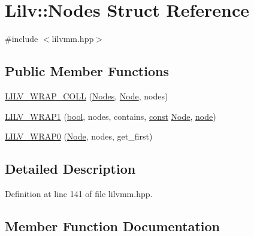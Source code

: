 \hypertarget{struct_lilv_1_1_nodes}{}\section{Lilv\+:\+:Nodes Struct Reference}
\label{struct_lilv_1_1_nodes}


{\ttfamily \#include $<$lilvmm.\+hpp$>$}

\subsection*{Public Member Functions}
\begin{DoxyCompactItemize}
\item 
\hyperlink{struct_lilv_1_1_nodes_ae3a152f247d1200901b7e9b3cc967046}{L\+I\+L\+V\+\_\+\+W\+R\+A\+P\+\_\+\+C\+O\+LL} (\hyperlink{struct_lilv_1_1_nodes}{Nodes}, \hyperlink{struct_lilv_1_1_node}{Node}, nodes)
\item 
\hyperlink{struct_lilv_1_1_nodes_a41f848435708dc821ed1246b470fb9a1}{L\+I\+L\+V\+\_\+\+W\+R\+A\+P1} (\hyperlink{mac_2config_2i386_2lib-src_2libsoxr_2soxr-config_8h_abb452686968e48b67397da5f97445f5b}{bool}, nodes, contains, \hyperlink{getopt1_8c_a2c212835823e3c54a8ab6d95c652660e}{const} \hyperlink{struct_lilv_1_1_node}{Node}, \hyperlink{structnode}{node})
\item 
\hyperlink{struct_lilv_1_1_nodes_a336253b73f5d47fc1e8095520219f64e}{L\+I\+L\+V\+\_\+\+W\+R\+A\+P0} (\hyperlink{struct_lilv_1_1_node}{Node}, nodes, get\+\_\+first)
\end{DoxyCompactItemize}


\subsection{Detailed Description}


Definition at line 141 of file lilvmm.\+hpp.



\subsection{Member Function Documentation}
